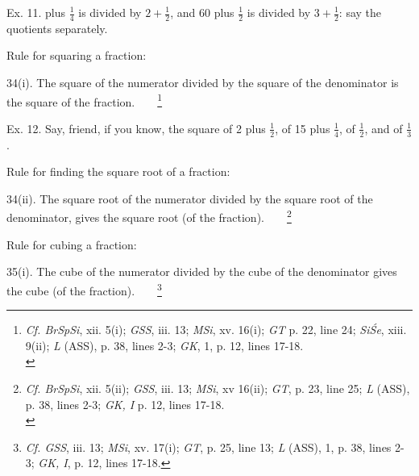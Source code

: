 \documentclass[10pt, openany]{book}
\begin{document}
{{{{{{{{{{{{{{{{{{{{\begin{sloppypar}
 Ex. 11.  plus $\frac{1}{4}$ is divided by $2 + \frac{1}{2}$, and 60 plus $\frac{1}{2}$ is
divided by $3 + \frac{1}{2}$: say the quotients separately.
\vspace{4mm}

\noindent Rule for squaring a fraction:
\vspace{3mm}

 34(i). The square of the numerator divided by the
square of the denominator is the square of the fraction.~~~~\renewcommand{\thefootnote}{\hspace{-4.5mm} 3}\footnote{\hspace{-2mm} \en \textit{Cf. BrSpSi}, xii. 5(i);  \textit{GSS}, iii. 13; \textit{MSi}, xv. 16(i); \textit{GT} p. 22,
line 24;  \textit{SiŚe}, xiii. 9(ii);  \textit{L} (ASS), p. 38, lines 2-3;  \textit{GK},
1, p. 12, lines 17-18.\\}
\vspace{3mm}

 Ex. 12. Say, friend, if you know, the square of 2 plus $\frac{1}{2}$,
of 15 plus $\frac{1}{4}$, of $\frac{1}{2}$, and of $\frac{1}{3}$.
\vspace{4mm}

\noindent Rule for finding the square root of a fraction:
\vspace{3mm}

 34(ii). The square root of the numerator divided by
the square root of the denominator, gives the square root
(of the fraction).~~~~\renewcommand{\thefootnote}{\hspace{-4.5mm} 4}\footnote{\hspace{-2mm} \en \textit{Cf. BrSpSi}, xii. 5(ii);  \textit{GSS}, iii. 13;  \textit{MSi}, xv 16(ii); \textit{GT}, p. 23,
line 25;  \textit{L} (ASS), p. 38, lines 2-3;  \textit{GK, I} p. 12, lines 17-18.\\}
\vspace{4mm}

\noindent Rule for cubing a fraction: 
\vspace{3mm}

 35(i). The cube of the numerator divided by the cube
of the denominator gives the cube (of the fraction).~~~~\renewcommand{\thefootnote}{\hspace{-4.5mm} 5}\footnote{\hspace{-2mm} \en \textit{Cf. GSS}, iii. 13;  \textit{MSi}, xv. 17(i);  \textit{GT}, p. 25, line 13; \textit{L} (ASS), 1,
p. 38, lines 2-3; \textit{GK, I}, p. 12, lines 17-18.}

\end{sloppypar}

}}}}}}}}}}}}}}}}}}}}
\end{document}
